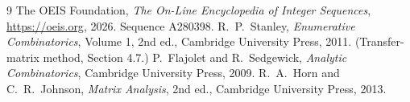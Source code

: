 \documentclass[11pt,a4paper]{article}
\theoremstyle{plain}
\theoremstyle{definition}
\begin{document}
\begin{thebibliography}{9}
 The OEIS Foundation, \emph{The On-Line Encyclopedia of Integer
Sequences}, \url{https://oeis.org}, 2026. Sequence A280398.
 R.~P.~Stanley, \emph{Enumerative Combinatorics}, Volume 1, 2nd ed.,
Cambridge University Press, 2011. (Transfer-matrix method, Section 4.7.)
 P.~Flajolet and R.~Sedgewick, \emph{Analytic Combinatorics}, Cambridge
University Press, 2009.
 R.~A.~Horn and C.~R.~Johnson, \emph{Matrix Analysis}, 2nd ed., Cambridge
University Press, 2013.
\end{thebibliography}
\end{document}
